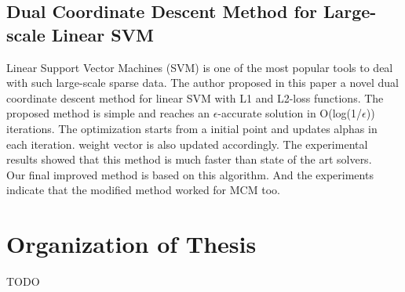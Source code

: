 \subsection{Dual Coordinate Descent Method for Large-scale Linear SVM}\label{DCDPaperReview}
Linear Support Vector Machines (SVM) is one of the most popular tools to deal with such large-scale sparse data. The author \cite{dcd} proposed in this paper a novel dual coordinate descent method for linear SVM with L1 and L2-loss functions. The proposed method is simple
and reaches an $\epsilon$-accurate solution in O(log(1/$\epsilon$)) iterations. The optimization starts from a initial point and updates alphas in each iteration. weight vector is also updated accordingly. The experimental results showed that this method is much faster than state of the art solvers.\\
Our final improved method is based on this algorithm. And the experiments indicate that the modified method worked for MCM too.

\section{Organization of Thesis}

TODO